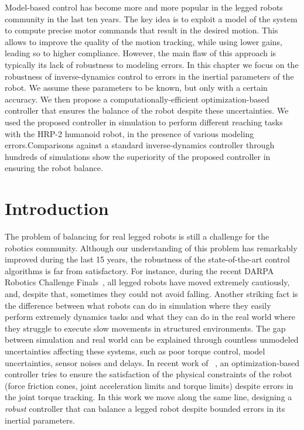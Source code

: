 
Model-based control has become more and more popular in the legged robots community in the last ten years. 
The key idea is to exploit a model of the system to compute precise motor commands that result in the desired motion.
This allows to improve the quality of the motion tracking, while using lower gains, leading so to higher compliance.
However, the main flaw of this approach is typically its lack of robustness to modeling errors. In this chapter we focus on the robustness of inverse-dynamics control to errors in the inertial parameters of the robot. We assume these parameters to be known, but only with a certain accuracy. We then propose a computationally-efficient optimization-based controller that ensures the balance of the robot despite these uncertainties. We used the proposed controller in simulation to perform different reaching tasks with the HRP-2 humanoid robot, in the presence of various modeling errors.Comparisons against a standard inverse-dynamics controller through hundreds of simulations show the superiority of the proposed controller in ensuring the robot balance.
\section{Introduction}
The problem of balancing for real legged robots is still a challenge for the robotics community.
Although our understanding of this problem has remarkably improved during the last 15 years, the robustness of the state-of-the-art control algorithms is far from satisfactory.
For instance, during the recent DARPA Robotics Challenge Finals~\cite{Pratt2015}, all legged robots have moved extremely cautiously, and, despite that, sometimes they could not avoid falling.
Another striking fact is the difference between what robots can do in simulation where they easily perform extremely dynamics tasks and what they can do in the real world where they struggle to execute slow movements in structured environments.
The gap between simulation and real world can be explained through countless unmodeled uncertainties affecting these systems, such as poor torque control, model uncertainties, sensor noises and delays.
In recent work of ~\cite{DelPrete2015b}, an optimization-based controller tries to ensure the satisfaction of the physical constraints of the robot (force friction cones, joint acceleration limits and torque limits) despite errors in the joint torque tracking. In this work we move along the same line, designing a \emph{robust} controller that can balance a legged robot despite bounded errors in its inertial parameters.




